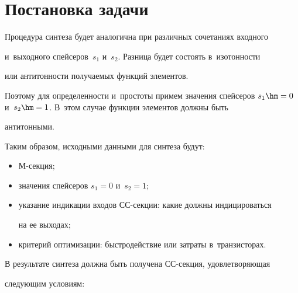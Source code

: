    


\section{Постановка задачи}





\vspace*{-3pt}


       


   Процедура синтеза будет аналогична при различных сочетаниях входного 


и~выходного спейсеров~$s_1$ и~$s_2$. Разница будет состоять в~изотонности 


или антитонности получаемых функций элементов.




   Поэтому для определенности и~простоты примем значения спейсеров $s_1\hm 


= 0$ и~$s_2 \hm= 1$. В~этом случае функции элементов должны быть 


антитонными.


   


   Таким образом, исходными данными для синтеза будут:


   \begin{itemize}


   \item М-секция;\\[-14.5pt]


   \item значения спейсеров $s_1 = 0$ и~$s_2 = 1$;\\[-14.5pt]


   \item указание индикации входов СС-секции: какие должны индицироваться 


на ее выходах;\\[-14.5pt]


   \item критерий оптимизации: быстродействие или затраты в~транзисторах.


   \end{itemize}


   


   В результате синтеза должна быть получена СС-сек\-ция, удовлетворяющая 


следующим условиям:





